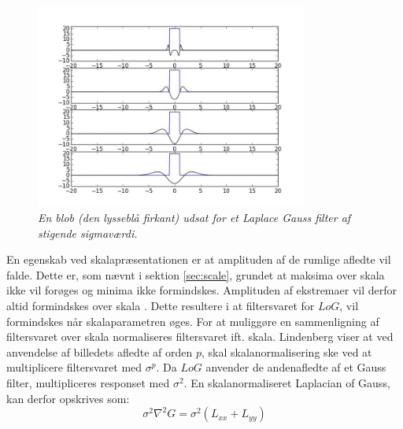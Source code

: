 \begin{figure}[H]
    \centering
    \includegraphics[width=0.80\textwidth]{fig/42.jpg}
    \vspace{-0.75em}
    \begin{center}
    \caption{{\footnotesize \textit{En blob (den lysseblå firkant) udsat for et Laplace Gauss filter af stigende sigmaværdi.
}}}
    \label{fig:laprespons}
     \end{center}
  \end{figure}
       \vspace{-2.7em}
\noindent
En egenskab ved skalapræsentationen er at amplituden af de rumlige afledte vil falde. Dette er, som nævnt i sektion \ref{sec:scale}, grundet at maksima over skala ikke vil forøges og minima ikke formindskes. Amplituden af ekstremaer vil derfor altid formindskes over skala \cite{phdlind}. Dette resultere i at filtersvaret for $LoG$, vil formindskes når skalaparametren øges. For at muliggøre en sammenligning af filtersvaret over skala normaliseres filtersvaret ift. skala.  Lindenberg \cite{lindenscale} viser at ved anvendelse af billedets afledte af orden $p$, skal skalanormalisering ske ved at multiplicere filtersvaret med $\sigma^p$. Da $LoG$ anvender de andenafledte af et Gauss filter, multipliceres responset med $\sigma^2$. En skalanormaliseret Laplacian of Gauss, kan derfor opskrives som:
$$\sigma^2 \nabla^2G = \sigma^2(L_{xx}+L_{yy})$$